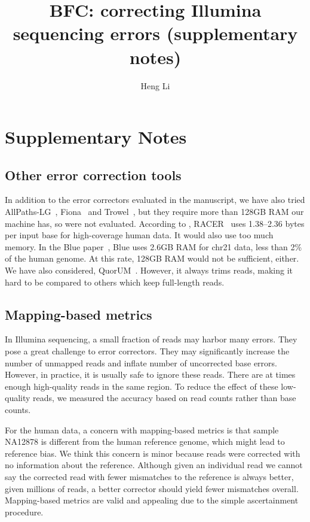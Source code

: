 \documentclass{bioinfo2}
\begin{document}

\title[Error Correction for Illumina Data]{BFC: correcting Illumina sequencing errors (supplementary notes)}
\author[Li]{Heng Li}
\address{Broad Institute, 75 Ames Street, Cambridge, MA 02142, USA}
\maketitle

\section{Supplementary Notes}

\subsection{Other error correction tools}

In addition to the error correctors evaluated in the manuscript, we have also
tried AllPaths-LG~\citep{Gnerre:2011ys}, Fiona~\citep{Schulz:2014aa} and
Trowel~\citep{Lim:2014aa}, but they require more than 128GB RAM our machine
has, so were not evaluated. According to \citet{Molnar:2014aa},
RACER~\citep{Ilie:2013aa} uses 1.38--2.36 bytes per input base for
high-coverage human data. It would also use too much memory.  In the Blue
paper~\citep{Greenfield:2014aa}, Blue uses 2.6GB RAM for chr21 data, less than
2\% of the human genome. At this rate, 128GB RAM would not be sufficient,
either. We have also considered, QuorUM~\citep{Zimin:2013aa}.  However,
it always trims reads, making it hard to be compared to others which keep
full-length reads.

\subsection{Mapping-based metrics}

In Illumina sequencing, a small fraction of reads may harbor many errors. They
pose a great challenge to error correctors. They may significantly increase
the number of unmapped reads and inflate number of uncorrected base errors.
However, in practice, it is usually safe to ignore these reads. There are at
times enough high-quality reads in the same region. To reduce the effect
of these low-quality reads, we measured the accuracy based on read counts
rather than base counts.

For the human data, a concern with mapping-based metrics is that sample NA12878
is different from the human reference genome, which might lead to reference
bias. We think this concern is minor because reads were corrected with no
information about the reference. Although given an individual read we cannot say
the corrected read with fewer mismatches to the reference is always better, given
millions of reads, a better corrector should yield fewer mismatches overall.
Mapping-based metrics are valid and appealing due to the simple ascertainment
procedure.
\end{document}
